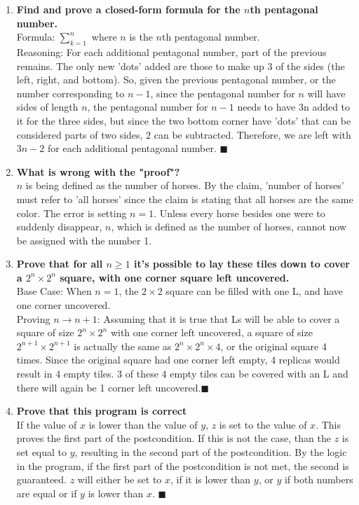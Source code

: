 \documentclass{article}
\begin{document}
\begin{enumerate}
\item \textbf{Find and prove a closed-form formula for the $n$th pentagonal number.} \\
Formula: $\sum_{k=1}^{n}$ where $n$ is the $n$th pentagonal number. \\
Reasoning: For each additional pentagonal number, part of the previous remains. The only new 'dots' added are those to make up 3 of the sides (the left, right, and bottom). So, given the previous pentagonal number, or the number corresponding to $n-1$, since the pentagonal number for $n$ will have sides of length $n$, the pentagonal number for $n-1$ needs to have 3n added to it for the three sides, but since the two bottom corner have 'dots' that can be considered parts of two sides, $2$ can be subtracted. Therefore, we are left with $3n-2$ for each additional pentagonal number. $\blacksquare$ \\

\item \textbf{What is wrong with the "proof"?} \\
$n$ is being defined as the number of horses. By the claim, 'number of horses' must refer to 'all horses' since the claim is stating that all horses are the same color. The error is setting $n=1$. Unless every horse besides one were to suddenly disappear, $n$, which is defined as the number of horses, cannot now be assigned with the number 1.

\item \textbf{Prove that for all $n \geq 1$ it's possible to lay these tiles down to cover a $2^n \times 2^n$ square, with one corner square left uncovered.} \\
Base Case: When $n = 1$, the $2 \times 2$ square can be filled with one L, and have one corner uncovered. \\
Proving $n \to n+1$: Assuming that it is true that Ls will be able to cover a square of size $2^n \times 2^n$ with one corner left uncovered, a square of size $2^{n+1} \times 2^{n+1}$ is actually the same as $2^n \times 2^n \times 4$, or the original square 4 times. Since the original square had one corner left empty, 4 replicas would result in 4 empty tiles. 3 of these 4 empty tiles can be covered with an L and there will again be 1 corner left uncovered.$\blacksquare$ \\

\item \textbf{Prove that this program is correct} \\
If the value of $x$ is lower than the value of $y$, $z$ is set to the value of $x$. This proves the first part of the postcondition. If this is not the case, than the $z$ is set equal to $y$, resulting in the second part of the postcondition. By the logic in the program, if the first part of the postcondition is not met, the second is guaranteed. $z$ will either be set to $x$, if it is lower than $y$, or $y$ if both numbers are equal or if $y$ is lower than $x$. $\blacksquare$


\end{enumerate}
\end{document}
